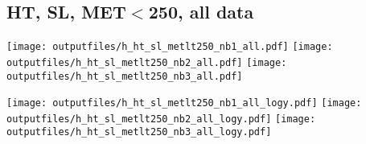 \documentclass[11pt]{article}
\begin{document}
   \clearpage












    \subsection{ HT, SL, MET$<$250, all data}

    \noindent
     \texttt{[image: outputfiles/h\_ht\_sl\_metlt250\_nb1\_all.pdf]}
     \texttt{[image: outputfiles/h\_ht\_sl\_metlt250\_nb2\_all.pdf]}
     \texttt{[image: outputfiles/h\_ht\_sl\_metlt250\_nb3\_all.pdf]}

    \noindent
     \texttt{[image: outputfiles/h\_ht\_sl\_metlt250\_nb1\_all\_logy.pdf]}
     \texttt{[image: outputfiles/h\_ht\_sl\_metlt250\_nb2\_all\_logy.pdf]}
     \texttt{[image: outputfiles/h\_ht\_sl\_metlt250\_nb3\_all\_logy.pdf]}
\end{document}
